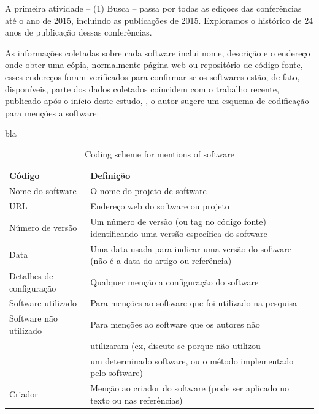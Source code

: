 A primeira atividade -- (1) Busca -- passa por todas as ediçoes das
conferências até o ano de 2015, incluindo as publicações de 2015.  Exploramos o
histórico de 24 anos de publicação dessas conferências.

As informações coletadas sobre cada software inclui nome, descrição e o
endereço onde obter uma cópia, normalmente página web ou repositório de código
fonte, esses endereços foram verificados para confirmar se os softwares estão,
de fato, disponíveis, parte dos dados coletados coincidem com o trabalho
recente, publicado após o início deste estudo, \cite{howison2016software}, o
autor sugere um esquema de codificação para menções a software:


\begin{minipage}[t]{0.3\textwidth}
bla
\end{minipage}

\begin{table}[h]
\caption{Coding scheme for mentions of software \cite{howison2016software}}
\centering
\begin{tabular}{ l p{8cm} }
  \hline
  Código                   & Definição \\
  \hline
  Nome do software         & O nome do projeto de software \\
  URL                      & Endereço web do software ou projeto \\
  Número de versão         & Um número de versão (ou tag no código fonte) identificando uma versão específica do software \\
  Data                     & Uma data usada para indicar uma versão do software (não é a data do artigo ou referência) \\
  Detalhes de configuração & Qualquer menção a configuração do software \\
  Software utilizado       & Para menções ao software que foi utilizado na pesquisa \\
  Software não utilizado   & Para menções ao software que os autores não \\
                           & utilizaram (ex, discute-se porque não utilizou \\
                           & um determinado software, ou o método implementado pelo software) \\
  Criador                  & Menção ao criador do software (pode ser aplicado no texto ou nas referências) \\
  \hline
\end{tabular}
\label{coding-scheme-mentions}
\end{table}


